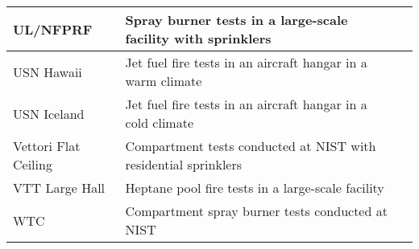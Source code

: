 \begin{table}[!ht]
\begin{center}
\begin{tabular}{|l|l|c|}
UL/NFPRF              &  Spray burner tests in a large-scale facility with sprinklers       &  \cite{Sheppard:1, McGrattan:5}             \\ \hline
USN Hawaii            &  Jet fuel fire tests in an aircraft hangar in a warm climate        &  \cite{Gott:1}                              \\ \hline
USN Iceland           &  Jet fuel fire tests in an aircraft hangar in a cold climate        &  \cite{Gott:1}                              \\ \hline
Vettori Flat Ceiling  &  Compartment tests conducted at NIST with residential sprinklers    &  \cite{Vettori:1}                           \\ \hline
VTT Large Hall        &  Heptane pool fire tests in a large-scale facility                  &  \cite{Hostikka:VTT2104}                    \\ \hline
WTC                   &  Compartment spray burner tests conducted at NIST                   &  \cite{NIST_NCSTAR_1-5B}                    \\ \hline
\end{tabular}
\end{center}
\label{tab:exp_data_sets}
\end{table}